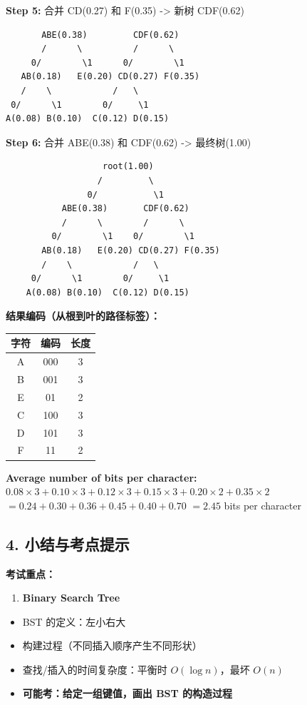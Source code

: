 \documentclass[10pt,a4paper,openany]{ctexbook}
\theoremstyle{definition}
\theoremstyle{remark}
\begin{document}
\textbf{Step 5:} 合并 CD(0.27) 和 F(0.35) -> 新树 CDF(0.62)
{\footnotesize\begin{verbatim}
       ABE(0.38)         CDF(0.62)
       /      \          /      \
     0/        \1      0/        \1
   AB(0.18)   E(0.20) CD(0.27) F(0.35)
   /    \            /   \
 0/      \1        0/     \1
A(0.08) B(0.10)  C(0.12) D(0.15)
\end{verbatim}}

\textbf{Step 6:} 合并 ABE(0.38) 和 CDF(0.62) -> 最终树(1.00)
{\footnotesize\begin{verbatim}
                   root(1.00)
                  /         \
                0/           \1
           ABE(0.38)       CDF(0.62)
           /      \        /      \
         0/        \1    0/        \1
       AB(0.18)   E(0.20) CD(0.27) F(0.35)
       /    \            /   \
     0/      \1        0/     \1
    A(0.08) B(0.10)  C(0.12) D(0.15)
\end{verbatim}}

\textbf{结果编码（从根到叶的路径标签）：}
\begin{center}
\begin{tabular}{ccc}
\hline
字符 & 编码 & 长度 \\ \hline
A & 000 & 3 \\
B & 001 & 3 \\
E & 01 & 2 \\
C & 100 & 3 \\
D & 101 & 3 \\
F & 11 & 2 \\
\hline
\end{tabular}

\end{center}

\textbf{Average number of bits per character:}
$0.08 \times 3 + 0.10 \times 3 + 0.12 \times 3 + 0.15 \times 3 + 0.20 \times 2 + 0.35 \times 2$
$= 0.24 + 0.30 + 0.36 + 0.45 + 0.40 + 0.70$
$= 2.45$ bits per character
\vspace{-2pt}

\subsection{4. 小结与考点提示}

\textbf{考试重点：}
\begin{enumerate}
\item \textbf{Binary Search Tree}
\end{enumerate}

\begin{itemize}
\item BST 的定义：左小右大
\item 构建过程（不同插入顺序产生不同形状）
\item 查找/插入的时间复杂度：平衡时 $O(\log n)$，最坏 $O(n)$
\item \textbf{可能考：给定一组键值，画出 BST 的构造过程}

\end{itemize}
\end{document}
